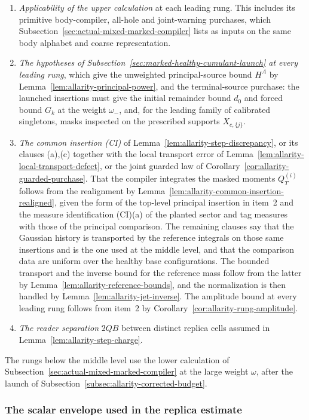 \begin{enumerate}
\item \emph{Applicability of the upper calculation} at each leading rung.
 This includes its primitive body-compiler, all-hole and joint-warning
 purchases, which Subsection~\ref{sec:actual-mixed-marked-compiler} lists as
 inputs on the same body alphabet and coarse representation.
\item \emph{The hypotheses of
 Subsection~\ref{sec:marked-healthy-cumulant-launch} at every leading rung},
 which give the unweighted principal-source bound $H^A$ by
 Lemma~\ref{lem:allarity-principal-power}, and the terminal-source
 purchase: the launched insertions must give the initial
 remainder bound $d_0$ and forced bound $G_k$ at the weight $\omega_-$,
 and, for the leading family of calibrated singletons, masks inspected on
 the prescribed supports $X_{c,\{j\}}$.
\item \emph{The common insertion (CI)} of
 Lemma~\ref{lem:allarity-step-discrepancy}, or its clauses (a),(c)
 together with the local transport error of
 Lemma~\ref{lem:allarity-local-transport-defect}, or the joint guarded
 law of Corollary~\ref{cor:allarity-guarded-purchase}. That the compiler integrates the
 masked moments $Q^{(i)}_T$ follows from the realignment by
 Lemma~\ref{lem:allarity-common-insertion-realigned}, given the form of the
 top-level principal insertion in item~2 and the measure identification
 (CI)(a) of the planted sector and tag measures with those of the
 principal comparison. The remaining clauses say that the Gaussian history is transported by the
 reference integrals on those same insertions and is the one used at the
 middle level, and that the comparison data are uniform over the healthy
 base configurations. The bounded transport and the inverse bound for the
 reference mass follow from the latter by
 Lemma~\ref{lem:allarity-reference-bounds}, and the normalization is then
 handled by Lemma~\ref{lem:allarity-jet-inverse}. The
 amplitude bound at every leading rung follows from item~2
 by Corollary~\ref{cor:allarity-rung-amplitude}.
\item \emph{The reader separation} $2QB$ between distinct replica cells
 assumed in Lemma~\ref{lem:allarity-step-charge}.
\end{enumerate}
The rungs below the middle level use the lower calculation of
Subsection~\ref{sec:actual-mixed-marked-compiler} at the large weight
$\omega$, after the launch of
Subsection~\ref{subsec:allarity-corrected-budget}.

\subsubsection{The scalar envelope used in the replica estimate}

